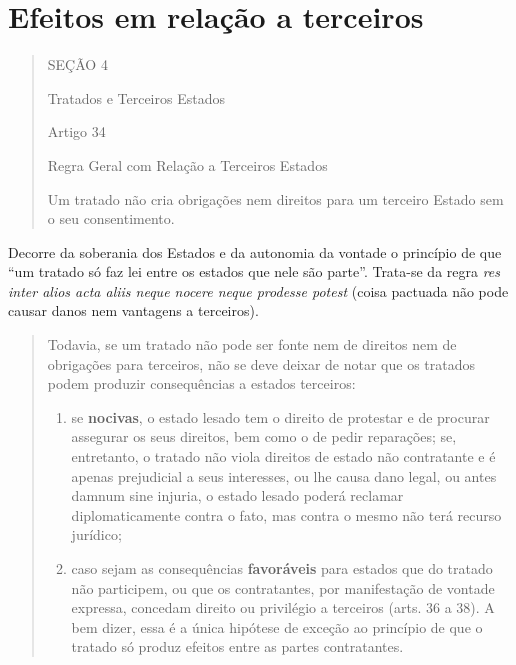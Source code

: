 \documentclass{article}
\begin{document}
\section{Efeitos em relação a terceiros}

\begin{quote}
    \begin{center}
         SEÇÃO 4

        Tratados e Terceiros Estados 
        
        Artigo 34
        
        Regra Geral com Relação a Terceiros Estados
    \end{center}
    Um tratado não cria obrigações nem direitos para um terceiro Estado sem o seu consentimento.
    \cite{brasil_decreto_2009}
\end{quote}

Decorre da soberania dos Estados e da autonomia da vontade o princípio de que ``um tratado só faz lei entre os estados que nele são parte”. Trata-se da regra \textit{res inter alios acta aliis neque nocere neque prodesse potest} (coisa pactuada não pode causar danos nem vantagens a terceiros).

\begin{quote}
    Todavia, se um tratado não pode ser fonte nem de direitos nem de obrigações para terceiros, não se deve deixar de notar que os tratados podem produzir consequências a estados terceiros:
    \begin{enumerate} [1º)]
        \item se \textbf{nocivas}, o estado lesado tem o direito de protestar e de procurar assegurar os seus direitos, bem como o de pedir reparações; se, entretanto, o tratado não viola direitos de estado não contratante e é apenas prejudicial a seus interesses, ou lhe causa dano legal, ou antes damnum sine injuria, o estado lesado poderá reclamar diplomaticamente contra o fato, mas contra o mesmo não terá recurso jurídico;
        \item caso sejam as consequências \textbf{favoráveis} para estados que do tratado não participem, ou que os contratantes, por manifestação de vontade expressa, concedam direito ou privilégio a terceiros (arts. 36 a 38). A bem dizer, essa é a única hipótese de exceção ao princípio de que o tratado só produz efeitos entre as partes contratantes.
    \end{enumerate}
    \cite[p.~157]{accioly_manual_2023}
\end{quote}
\end{document}
